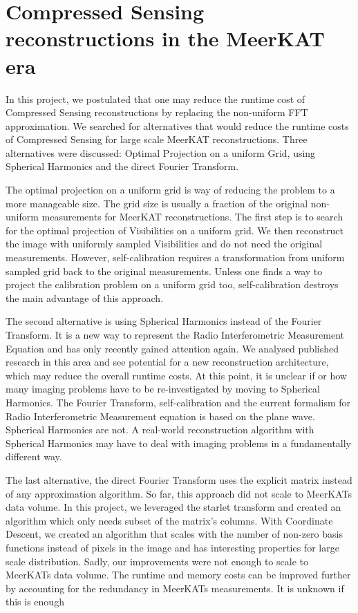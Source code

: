 \section{Compressed Sensing reconstructions in the MeerKAT era}
In this project, we postulated that one may reduce the runtime cost of Compressed Sensing reconstructions by replacing the non-uniform FFT approximation. We searched for alternatives that would reduce the runtime costs of Compressed Sensing for large scale MeerKAT reconstructions. Three alternatives were discussed: Optimal Projection on a uniform Grid, using Spherical Harmonics and the direct Fourier Transform.

The optimal projection on a uniform grid is way of reducing the problem to a more manageable size. The grid size is usually a fraction of the original non-uniform measurements for MeerKAT reconstructions. The first step is to search for the optimal projection of Visibilities on a uniform grid. We then reconstruct the image with uniformly sampled Visibilities and do not need the original measurements. However, self-calibration requires a transformation from uniform sampled grid back to the original measurements. Unless one finds a way to project the calibration problem on a uniform grid too, self-calibration destroys the main advantage of this approach.

The second alternative is using Spherical Harmonics instead of the Fourier Transform. It is a new way to represent the Radio Interferometric Measurement Equation and has only recently gained attention again. We analysed published research in this area\cite{carozzi2015imaging, mcewen2008simulating} and see potential for a new reconstruction architecture, which may reduce the overall runtime costs. At this point, it is unclear if or how many imaging problems have to be re-investigated by moving to Spherical Harmonics. The Fourier Transform, self-calibration and the current formalism for Radio Interferometric Measurement equation is based on the plane wave\cite{smirnov2011revisiting}. Spherical Harmonics are not. A real-world reconstruction algorithm with Spherical Harmonics may have to deal with imaging problems in a fundamentally different way.

The last alternative, the direct Fourier Transform uses the explicit matrix instead of any approximation algorithm. So far, this approach did not scale to MeerKATs data volume. In this project, we leveraged the starlet transform and created an algorithm which only needs subset of the matrix's columns. With Coordinate Descent, we created an algorithm that scales with the number of non-zero basis functions instead of pixels in the image and has interesting properties for large scale distribution. Sadly, our improvements were not enough to scale to MeerKATs data volume. The runtime and memory costs can be improved further by accounting for the redundancy in MeerKATs measurements. It is unknown if this is enough

